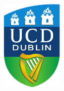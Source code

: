 
\begin{titlepage}

\begin{addmargin}[-1cm]{-3cm}
\begin{center}
\large

\hfill
\vfill

\begingroup
\color{Maroon}\spacedallcaps{\myTitle} \\ \bigskip %
\endgroup

\spacedlowsmallcaps{\myName} \\%
\myID
\vfill

\vspace{4cm}

\includegraphics[width=3cm]{gfx/logo} \\ \medskip %

\myDegree \\ \bigskip
\myFaculty \\ 
\myUni \\  \bigskip


\myHOS \\  
\bigskip
\mySupervisor \\ 

\vspace{6cm}

\myTime\ %

\vfill

\end{center}
\end{addmargin}

\end{titlepage}